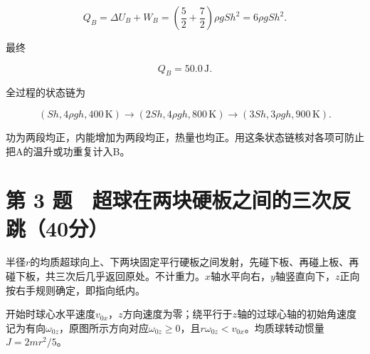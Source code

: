\documentclass[12pt,a4paper,fontset=fandol]{ctexart}
\begin{document}
\[
Q_B=\Delta U_B+W_B
=\left(\frac52+\frac72\right)\rho gSh^2
=6\rho gSh^2.
\]

最终

\[
\boxed{Q_B=50.0\,\mathrm J}.
\]

全过程的状态链为

\[
(Sh,4\rho gh,400\,\mathrm K)
\longrightarrow
(2Sh,4\rho gh,800\,\mathrm K)
\longrightarrow
(3Sh,3\rho gh,900\,\mathrm K).
\]

功为两段均正，内能增加为两段均正，热量也均正。用这条状态链核对各项可防止把A的温升或功重复计入B。

\clearpage

\section{第 3
题　超球在两块硬板之间的三次反跳（40分）}\label{ux7b2c-3-ux9898-ux8d85ux7403ux5728ux4e24ux5757ux786cux677fux4e4bux95f4ux7684ux4e09ux6b21ux53cdux8df340ux5206}

半径\(r\)的均质超球向上、下两块固定平行硬板之间发射，先碰下板、再碰上板、再碰下板，共三次后几乎返回原处。不计重力。\(x\)轴水平向右，\(y\)轴竖直向下，\(z\)正向按右手规则确定，即指向纸内。

开始时球心水平速度\(v_{0x}\)，\(z\)方向速度为零；绕平行于\(z\)轴的过球心轴的初始角速度记为有向\(\omega_{0z}\)，原图所示方向对应\(\omega_{0z}\geq0\)，且\(r\omega_{0z}<v_{0x}\)。均质球转动惯量\(J=2mr^2/5\)。

\begin{center}
\begin{minipage}{\linewidth}
\centering\begingroup{}
\ifdim\wd\diagrambox>.88\linewidth
\sbox{\diagrambox}{\resizebox{.88\linewidth}{!}{\usebox{\diagrambox}}}\fi
\ifdim\ht\diagrambox>.38\textheight
\resizebox{!}{.38\textheight}{\usebox{\diagrambox}}
\else\usebox{\diagrambox}\fi
\par{}\endgroup\end{minipage}\end{center}
\end{document}
